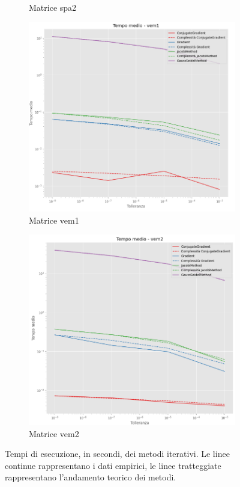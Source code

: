 \begin{figure}[!ht]
\begin{subfigure}{0.45\textwidth}
        \caption{Matrice spa2}
        \label{fig:time_spa2}
    \end{subfigure}
    \hfill
    \begin{subfigure}{0.45\textwidth}
        \centering
        \includegraphics[width=\textwidth]{./../report/Progetto_1_bis/img/time_vem1.png}
        \caption{Matrice vem1}
        \label{fig:time_vem1}
    \end{subfigure}
    \hfill
    \begin{subfigure}{0.45\textwidth}
        \centering
        \includegraphics[width=\textwidth]{./../report/Progetto_1_bis/img/time_vem2.png}
        \caption{Matrice vem2}
        \label{fig:time_vem2}
    \end{subfigure}
    \caption{Tempi di esecuzione, in secondi, dei metodi iterativi. Le linee
        continue rappresentano i dati empirici, le linee tratteggiate rappresentano
        l'andamento teorico dei metodi.}
    \label{fig:time}
\end{figure}

